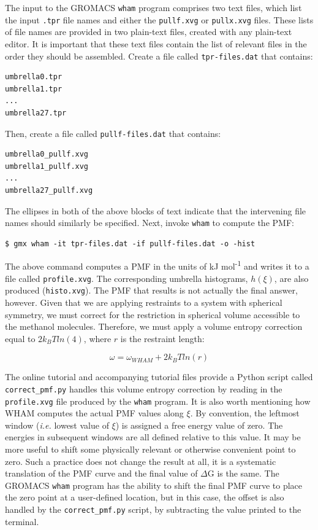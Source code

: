 \documentclass[9pt,tutorial,pubversion]{livecoms}
\begin{document}
The input to the GROMACS \texttt{wham} program comprises two text files, which list the input \texttt{.tpr} file names and either the \texttt{pullf.xvg} or \texttt{pullx.xvg} files. These lists of file names are provided in two plain-text files, created with any plain-text editor. It is important that these text files contain the list of relevant files in the order they should be assembled. Create a file called \texttt{tpr-files.dat} that contains:

\begin{lstlisting}
umbrella0.tpr
umbrella1.tpr
...
umbrella27.tpr
\end{lstlisting}

Then, create a file called \texttt{pullf-files.dat} that contains:

\begin{lstlisting}
umbrella0_pullf.xvg
umbrella1_pullf.xvg
...
umbrella27_pullf.xvg
\end{lstlisting}

The ellipses in both of the above blocks of text indicate that the intervening file names should similarly be specified. Next, invoke \texttt{wham} to compute the PMF:

\begin{lstlisting}
$ gmx wham -it tpr-files.dat -if pullf-files.dat -o -hist
\end{lstlisting}

The above command computes a PMF in the units of kJ mol\textsuperscript{-1} and writes it to a file called \texttt{profile.xvg}. The corresponding umbrella histograms, $h(\xi)$, are also produced (\texttt{histo.xvg}). The PMF that results is not actually the final answer, however. Given that we are applying restraints to a system with spherical symmetry, we must correct for the restriction in spherical volume accessible to the methanol molecules. Therefore, we must apply a volume entropy correction equal to $2 k_B T ln(4)$, where $r$ is the restraint length:

\begin{equation}
\omega = \omega_{WHAM} + 2 k_B T ln(r)
\label{eq_pmf_correction}
\end{equation}

The online tutorial and accompanying tutorial files provide a Python script called \texttt{correct\_pmf.py} handles this volume entropy correction by reading in the \texttt{profile.xvg} file produced by the \texttt{wham} program. It is also worth mentioning how WHAM computes the actual PMF values along $\xi$. By convention, the leftmost window ({\em i.e.} lowest value of $\xi$) is assigned a free energy value of zero. The energies in subsequent windows are all defined relative to this value. It may be more useful to shift some physically relevant or otherwise convenient point to zero. Such a practice does not change the result at all, it is a systematic translation of the PMF curve and the final value of $\Delta$G is the same. The GROMACS \texttt{wham} program has the ability to shift the final PMF curve to place the zero point at a user-defined location, but in this case, the offset is also handled by the \texttt{correct\_pmf.py} script, by subtracting the value printed to the terminal.
\end{document}
